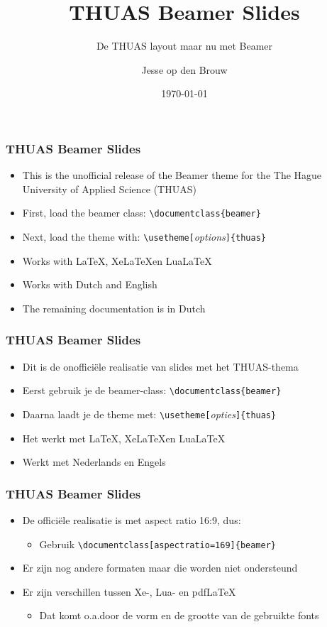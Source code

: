 \documentclass[fleqn,aspectratio=169,dutch,10pt]{beamer}
\title{THUAS Beamer Slides}
\subtitle{De THUAS layout maar nu met Beamer}
\author{Jesse op den Brouw}
\date{\today}
\begin{document}
\maketitle


\begin{frame}[fragile]
\frametitle{THUAS Beamer Slides}
\begin{itemize}
\item This is the unofficial release of the Beamer theme for the The Hague University of Applied Science (THUAS)
\item First, load the beamer class: \lstinline|\documentclass{beamer}|
\item Next, load the theme with: \lstinline|\usetheme[|\emph{\small options}\lstinline|]{thuas}|
\item Works with \LaTeX, Xe\LaTeX en Lua\LaTeX
\item Works with Dutch and English
\item The remaining documentation is in Dutch
\end{itemize}
\end{frame}


\begin{frame}[fragile]
\frametitle{THUAS Beamer Slides}
\begin{itemize}
\item Dit is de onofficiële realisatie van slides met het THUAS-thema
\item Eerst gebruik je de beamer-class: \lstinline|\documentclass{beamer}|
\item Daarna laadt je de theme met: \lstinline|\usetheme[|\emph{\small opties}\lstinline|]{thuas}|
\item Het werkt met \LaTeX, Xe\LaTeX en Lua\LaTeX
\item Werkt met Nederlands en Engels
\end{itemize}
\end{frame}


\begin{frame}[fragile]
\frametitle{THUAS Beamer Slides}
\begin{itemize}
\item De officiële realisatie is met aspect ratio 16:9, dus:
\begin{itemize}
\item Gebruik \lstinline|\documentclass[aspectratio=169]{beamer}|
\end{itemize}
\item Er zijn nog andere formaten maar die worden niet ondersteund
\item Er zijn verschillen tussen Xe-, Lua- en pdf\LaTeX
\begin{itemize}
\item Dat komt o.a.\@ door de vorm en de grootte van de gebruikte fonts
\end{itemize}
\end{itemize}
\end{frame}
\end{document}
